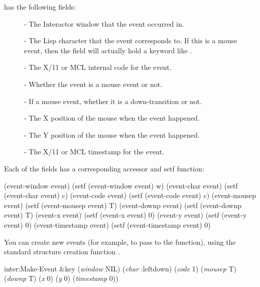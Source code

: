  has the following fields:
\begin{description}
\item[] 
- The Interactor window that the event occurred in.

\item[] 
- The Lisp character that the event corresponds to.  If this is a mouse
event, then the  field will actually hold a keyword like .

\item[] 
- The X/11 or MCL internal code for the event.

\item[] 
- Whether the event is a mouse event or not.

\item[] 
- If a mouse event, whether it is a down-transition or not.

\item[] 
- The X position of the mouse when the event happened.

\item[] 
- The Y position of the mouse when the event happened.

\item[] 
- The X/11 or MCL timestamp for the event.
\end{description}

Each of the fields has a corresponding accessor and setf function:
\begin{programexample}
(event-window event)     (setf (event-window event) w)
(event-char event)       (setf (event-char event) c)
(event-code event)       (setf (event-code event) c)
(event-mousep event)     (setf (event-mousep event) T)
(event-downp event)      (setf (event-downp event) T)
(event-x event)          (setf (event-x event) 0)
(event-y event)          (setf (event-y event) 0)
(event-timestamp event)  (setf (event-timestamp event) 0)
\end{programexample}


You can create new events (for example, to pass to the
 function), using the standard structure creation
function .
\begin{programexample}
inter:Make-Event \&key ({\it window} NIL) ({\it char} :leftdown) ({\it code} 1) ({\it mousep} T) \value{function}
                        ({\it downp} T) ({\it x} 0) ({\it y} 0) ({\it timestamp} 0))
\end{programexample}

